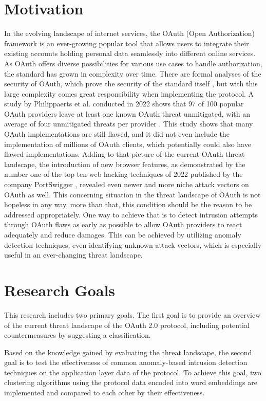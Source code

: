 \documentclass[
    fontsize=12pt,
    headings=small,
    parskip=half,           %
    bibliography=totoc,
    numbers=noenddot,       %
    open=any,               %
    ]{scrreprt}
\begin{document}
\section{Motivation}
In the evolving landscape of internet services, the OAuth (Open Authorization) framework is an ever-growing popular tool that allows users to integrate their existing accounts holding personal data seamlessly into different online services. As OAuth offers diverse possibilities for various use cases to handle authorization, the standard has grown in complexity over time. There are formal analyses of the security of OAuth, which prove the security of the standard itself \cite{fett2016comprehensive}, but with this large complexity comes great responsibility when implementing the protocol. A study by Philippaerts et al. conducted in 2022 shows that 97 of 100 popular OAuth providers leave at least one known OAuth threat unmitigated, with an average of four unmitigated threats per provider \cite{philippaerts2022oauch}. This study shows that many OAuth implementations are still flawed, and it did not even include the implementation of millions of OAuth clients, which potentially could also have flawed implementations. Adding to that picture of the current OAuth threat landscape, the introduction of new browser features, as demonstrated by the number one of the top ten web hacking techniques of 2022 published by the company PortSwigger \cite{kettle2022}, revealed even newer and more niche attack vectors on OAuth as well. This concerning situation in the threat landscape of OAuth is not hopeless in any way, more than that, this condition should be the reason to be addressed appropriately. One way to achieve that is to detect intrusion attempts through OAuth flaws as early as possible to allow OAuth providers to react adequately and reduce damages. This can be achieved by utilizing anomaly detection techniques, even identifying unknown attack vectors, which is especially useful in an ever-changing threat landscape.


\section{Research Goals}
This research includes two primary goals. The first goal is to provide an overview of the current threat landscape of the OAuth 2.0 protocol, including potential countermeasures by suggesting a classification. 

Based on the knowledge gained by evaluating the threat landscape, the second goal is to test the effectiveness of common anomaly-based intrusion detection techniques on the application layer data of the protocol. To achieve this goal, two clustering algorithms using the protocol data encoded into word embeddings are implemented and compared to each other by their effectiveness.
\end{document}
